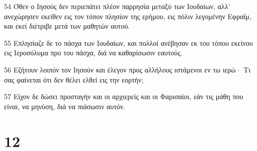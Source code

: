 \par 54 Όθεν ο Ιησούς δεν περιεπάτει πλέον παρρησία μεταξύ των Ιουδαίων, αλλ' ανεχώρησεν εκείθεν εις τον τόπον πλησίον της ερήμου, εις πόλιν λεγομένην Εφραΐμ, και εκεί διέτριβε μετά των μαθητών αυτού.
\par 55 Επλησίαζε δε το πάσχα των Ιουδαίων, και πολλοί ανέβησαν εκ του τόπου εκείνου εις Ιεροσόλυμα προ του πάσχα, διά να καθαρίσωσιν εαυτούς.
\par 56 Εζήτουν λοιπόν τον Ιησούν και έλεγον προς αλλήλους ιστάμενοι εν τω ιερώ· Τι σας φαίνεται ότι δεν θέλει ελθεί εις την εορτήν;
\par 57 Είχον δε δώσει προσταγήν και οι αρχιερείς και οι Φαρισαίοι, εάν τις μάθη που είναι, να μηνύση, διά να πιάσωσιν αυτόν.

\chapter{12}

